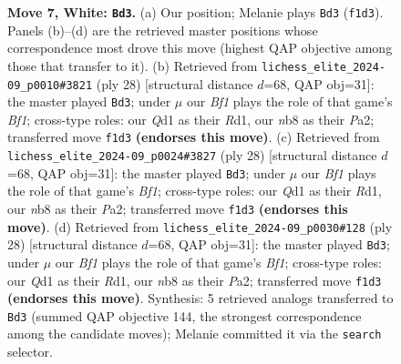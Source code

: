\documentclass[11pt]{article}
\begin{document}
\begin{figure}[p]
\caption{\textbf{Move 7, White: \texttt{Bd3}.} (a) Our position; Melanie plays \texttt{Bd3} (\texttt{f1d3}). Panels (b)--(d) are the retrieved master positions whose correspondence most drove this move (highest QAP objective among those that transfer to it). (b) Retrieved from \texttt{lichess\_elite\_2024-09\_p0010\#3821} (ply 28) [structural distance $d$=68, QAP obj=31]: the master played \texttt{Bd3}; under $\mu$ our \emph{Bf1} plays the role of that game's \emph{Bf1}; cross-type roles: our \emph{Q}d1 as their \emph{R}d1, our \emph{n}b8 as their \emph{P}a2; transferred move \texttt{f1d3} \textbf{(endorses this move)}. (c) Retrieved from \texttt{lichess\_elite\_2024-09\_p0024\#3827} (ply 28) [structural distance $d$=68, QAP obj=31]: the master played \texttt{Bd3}; under $\mu$ our \emph{Bf1} plays the role of that game's \emph{Bf1}; cross-type roles: our \emph{Q}d1 as their \emph{R}d1, our \emph{n}b8 as their \emph{P}a2; transferred move \texttt{f1d3} \textbf{(endorses this move)}. (d) Retrieved from \texttt{lichess\_elite\_2024-09\_p0030\#128} (ply 28) [structural distance $d$=68, QAP obj=31]: the master played \texttt{Bd3}; under $\mu$ our \emph{Bf1} plays the role of that game's \emph{Bf1}; cross-type roles: our \emph{Q}d1 as their \emph{R}d1, our \emph{n}b8 as their \emph{P}a2; transferred move \texttt{f1d3} \textbf{(endorses this move)}. Synthesis: 5 retrieved analogs transferred to \texttt{Bd3} (summed QAP objective 144, the strongest correspondence among the candidate moves); Melanie committed it via the \texttt{search} selector.}
\label{fig:thought-m12}
\end{figure}

\clearpage
\end{document}
